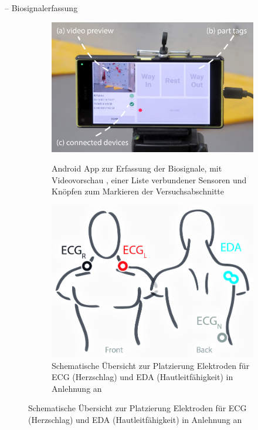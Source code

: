\begin{frame}{\currentname{} -- Biosignalerfassung}
\begin{figure}
	\centering
	\begin{subfigure}[b]{0.49\textwidth}
		\centering
		{
			\includegraphics[width=\textwidth]{include/images/android-app-photo.jpg}
			\label{fig:android-app-preview}
			\label{fig:android-app-parts}
			\label{fig:android-app-devices}
		}
		\captionsetup{subrefformat=parens}
		\caption{Android App zur Erfassung der Biosignale, mit Videovorschau , einer Liste verbundener Sensoren  und Knöpfen zum Markieren der Versuchsabschnitte }
		\label{fig:android-app}
	\end{subfigure}
	\hfill
	\begin{subfigure}[b]{0.49\textwidth}  
		\centering
		\includegraphics[width=\textwidth]{include/images/electrodes.jpg}
		\caption{Schematische Übersicht zur Platzierung Elektroden für ECG (Herzschlag) und EDA (Hautleitfähigkeit) in Anlehnung an \textcite{ECGLeadPlacement2015}}
		\label{fig:electrodes-schema}
	\end{subfigure}
	\label{fig:biosignals}
\end{figure}
\end{frame}

